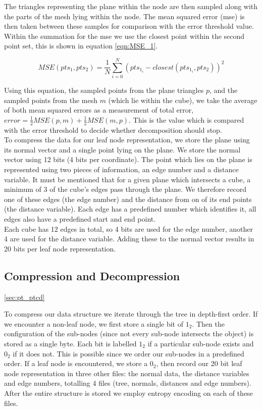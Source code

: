 The triangles representing the plane within the node are then sampled along with the parts of the mesh lying within the node. The mean squared error (mse) is then taken between these samples for comparison with the error threshold value. Within the summation for the mse we use the closest point within the second point set, this is shown in equation \ref{eqn:MSE_1}.

\begin{equation}
 \label{eqn:MSE_1}
MSE(pts_1, pts_2) = \frac{1}{N}\sum_{i=0}^{N} (pts_{1_i} - closest(pts_{1_i}, pts_2))^2
\end{equation}

Using this equation, the sampled points from the plane triangles $p$, and the sampled points from the mesh $m$ (which lie within the cube), we take the average of both mean squared errors as a measurement of total error, $error = \frac{1}{2}MSE(p,m) + \frac{1}{2}MSE(m,p)$. This is the value which is compared with the error threshold to decide whether decomposition should stop. \\

To compress the data for our leaf node representation, we store the plane using its normal vector and a single point lying on the plane. We store the normal vector using 12 bits (4 bits per coordinate). The point which lies on the plane is represented using two pieces of information, an edge number and a distance variable. It must be mentioned that for a given plane which intersects a cube, a minimum of 3 of the cube's edges pass through the plane. We therefore record one of these edges (the edge number) and the distance from on of its end points (the distance variable). Each edge has a predefined number which identifies it, all edges also have a predefined start and end point. \\

Each cube has 12 edges in total, so 4 bits are used for the edge number, another 4 are used for the distance variable. Adding these to the normal vector results in 20 bits per leaf node representation.  \\


\subsection{Compression and Decompression}
\ref{sec:pt_ptcd}

To compress our data structure we iterate through the tree in depth-first order. If we encounter a non-leaf node, we first store a single bit of $1_2$. Then the configuration of the sub-nodes (since not every sub-node intersects the object) is stored as a single byte. Each bit is labelled $1_2$ if a particular sub-node exists and $0_2$ if it does not. This is possible since we order our sub-nodes in a predefined order. If a leaf node is encountered, we store a $0_2$, then record our 20 bit leaf node representation in three other files: the normal data, the distance variables and edge numbers, totalling 4 files (tree, normals, distances and edge numbers). After the entire structure is stored we employ entropy encoding on each of these files. \\


